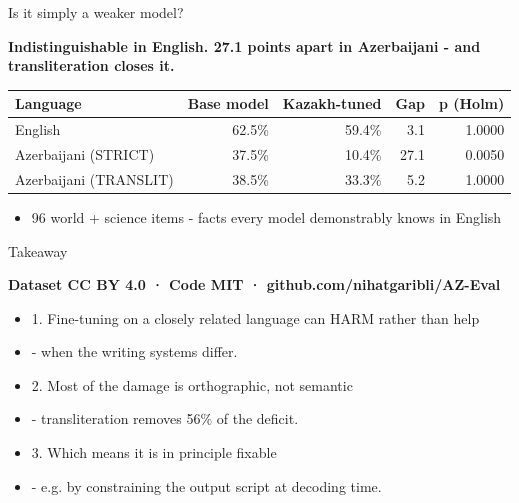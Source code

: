 \documentclass[aspectratio=169,12pt]{beamer}
\begin{document}
\begin{frame}{Is it simply a weaker model?}
\begin{center}{\large\bfseries Indistinguishable in English. 27.1 points apart in Azerbaijani - and transliteration closes it.}\end{center}
\vspace{0.3cm}
\begin{center}
\begin{tabular}{lrrrr}
\toprule
\textbf{Language} & \textbf{Base model} & \textbf{Kazakh-tuned} & \textbf{Gap} & \textbf{p (Holm)} \\
\midrule
English & 62.5\% & 59.4\% & 3.1 & 1.0000 \\
Azerbaijani (STRICT) & 37.5\% & 10.4\% & 27.1 & 0.0050 \\
Azerbaijani (TRANSLIT) & 38.5\% & 33.3\% & 5.2 & 1.0000 \\
\bottomrule
\end{tabular}
\end{center}
\vspace{0.3cm}
\begin{itemize}
  \item[] 96 world + science items - facts every model demonstrably knows in English
\end{itemize}
\end{frame}

\begin{frame}{Takeaway}
\begin{center}{\large\bfseries Dataset CC BY 4.0 · Code MIT · github.com/nihatgaribli/AZ-Eval}\end{center}
\vspace{0.3cm}
\begin{itemize}
  \item[] 1.  Fine-tuning on a closely related language can HARM rather than help
  \item[]      - when the writing systems differ.
\vspace{0.25cm}
  \item[] 2.  Most of the damage is orthographic, not semantic
  \item[]      - transliteration removes 56\% of the deficit.
\vspace{0.25cm}
  \item[] 3.  Which means it is in principle fixable
  \item[]      - e.g. by constraining the output script at decoding time.
\end{itemize}
\end{frame}
\end{document}
